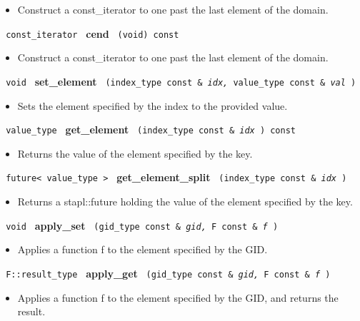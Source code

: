 \begin{itemize}
\item
Construct a const\_iterator to one past the last element of the domain.
\end{itemize}
 
\noindent
\texttt{%
const\_iterator
}
\textbf{cend}%
\texttt{%
(void) const
}

\begin{itemize}
\item
Construct a const\_iterator to one past the last element of the domain.
\end{itemize}
 
\noindent
\texttt{%
void
}
\textbf{set\_element}%
\texttt{%
(index\_type const \&
\textit{idx,}%
value\_type const \&
\textit{val}%
)
}

\begin{itemize}
\item
Sets the element specified by the index to the provided value.
\end{itemize}
 
\noindent
\texttt{%
value\_type
}
\textbf{get\_element}%
\texttt{%
(index\_type const \&
\textit{idx}%
) const
}

\begin{itemize}
\item
Returns the value of the element specified by the key.
\end{itemize}
 
\noindent
\texttt{%
future< value\_type >
}
\textbf{get\_element\_split}%
\texttt{%
(index\_type const \&
\textit{idx}%
)
}

\begin{itemize}
\item
Returns a stapl::future holding the value of the element specified by the key.
\end{itemize}
 
\noindent
\texttt{%
void
}
\textbf{apply\_set}%
\texttt{%
(gid\_type const \&
\textit{gid,}%
F const \&
\textit{f}%
)
}

\begin{itemize}
\item
Applies a function f to the element specified by the GID.
\end{itemize}
 
\noindent
\texttt{%
F::result\_type
}
\textbf{apply\_get}%
\texttt{%
(gid\_type const \&
\textit{gid,}%
F const \&
\textit{f}%
)
}

\begin{itemize}
\item
Applies a function f to the element specified by the GID, and returns the result.
\end{itemize}
 
